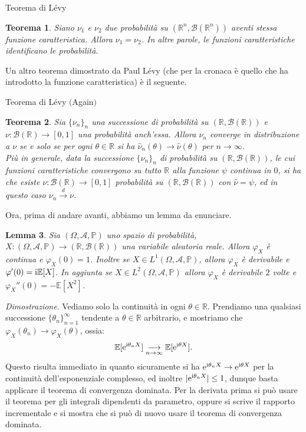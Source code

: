 \documentclass[11pt]{book}
\makeatletter
\theoremstyle{Definizione}
\theoremstyle{TeoremaProposizioneLemmaCorollario}
\newtheorem{myteo}{Teorema}[section]
\newtheorem{mylem}[myteo]{Lemma}
\theoremstyle{OsservazioneNota}
\renewenvironment{proof}[1][\proofname]{\par
  \normalfont \topsep6\p@\@plus6\p@\relax
  \trivlist
  \item[\hskip\labelsep
        \itshape
    #1\@addpunct{.}]\ignorespaces
}{%
  \endtrivlist\@endpefalse
}
\newcommand{\R}{\mathbb{R}}
\renewcommand{\P}{\mathbb{P}}
\newcommand{\e}{\textup{e}}
\renewcommand{\i}{\textup{i}}
\newcommand{\E}{\mathbb{E}}
\newcommand{\tod}{\overset{d}{\to}}
\renewenvironment{proof}{\textsl{Dimostrazione}.}{}
\makeatother
\begin{document}
\begin{boxteo}{Teorema di Lévy}
\begin{myteo}\label{teo:TeoremaDiLevy1}
Siano $\nu_1$ e $\nu_2$ due probabilità su $(\R^n,\mathcal{B}(\R^n))$ aventi stessa funzione caratteristica. Allora $\nu_1 = \nu_2$. In altre parole, le funzioni caratteristiche identificano le probabilità.
\end{myteo}
\end{boxteo}
\noindent
Un altro teorema dimostrato da Paul Lévy (che per la cronaca è quello che ha introdotto la funzione caratteristica) è il seguente.
\begin{boxteo}{Teorema di Lévy $($Again$)$}
\begin{myteo}
Sia $\{\nu_n\}_{n}$ una successione di probabilità su $(\R,\mathcal{B}(\R))$ e $\nu:\mathcal{B}(\R)\longrightarrow [0,1]$ una probabilità anch'essa. Allora $\nu_n$ converge in distribuzione a $\nu$ se e solo se per ogni $\theta\in \R$ si ha $\hat{\nu}_n(\theta)\to \hat{\nu}(\theta)$ per $n\to \infty$.\\
Più in generale, data la successione $\{\nu_n\}_{n}$ di probabilità su $(\R,\mathcal{B}(\R))$, le cui funzioni caratteristiche convergono su tutto $\R$ alla funzione $\psi$ continua in $0$, si ha che esiste $\nu:\mathcal{B}(\R)\longrightarrow [0,1]$ probabilità su $(\R,\mathcal{B}(\R))$ con $\hat{\nu} = \psi$, ed in questo caso $\nu_n \tod \nu$.
\end{myteo}
\end{boxteo}
\noindent
Ora, prima di andare avanti, abbiamo un lemma da enunciare.
\begin{boxoss}
\begin{mylem}\label{lem:LemmaDimostrazioneAlternativaTLC}
Sia $(\Omega,\mathcal{A},\P)$ uno spazio di probabilità, $X:(\Omega,\mathcal{A},\P)\longrightarrow (\R,\mathcal{B}(\R))$ una variabile aleatoria reale. Allora $\varphi_X$ è continua e $\varphi_X(0) = 1$. Inoltre se $X\in L^1(\Omega,\mathcal{A},\P)$, allora $\varphi_X$ è derivabile e $\varphi'(0) = \i \E[X]$. In aggiunta se $X\in L^2(\Omega,\mathcal{A},\P)$ allora $\varphi_X$ è derivabile $2$ volte e $\varphi_X''(0) = -\E[X^2]$.
\end{mylem}
\tcblower
\begin{proof}
Vediamo solo la continuità in ogni $\theta\in \R$. Prendiamo una qualsiasi successione $\{\theta_n\}_{n = 1}^\infty$ tendente a $\theta\in \R$ arbitrario, e mostriamo che $\varphi_X(\theta_n) \to \varphi_X(\theta)$, ossia:
$$
\E[\e^{\i\theta_n X}] \underset{n\to\infty}{\longrightarrow}\E[\e^{\i\theta X}].
$$
Questo risulta immediato in quanto sicuramente si ha $\e^{\i\theta_n X}\to \e^{\i\theta X}$ per la continuità dell'esponenziale complesso, ed inoltre $|\e^{\i\theta_n X}| \leq 1$, dunque basta applicare il teorema di convergenza dominata. Per la derivata prima si può usare il teorema per gli integrali dipendenti da parametro, oppure si scrive il rapporto incrementale e si mostra che si può di nuovo usare il teorema di convergenza dominata.
\end{proof}
\end{boxoss}
\end{document}
